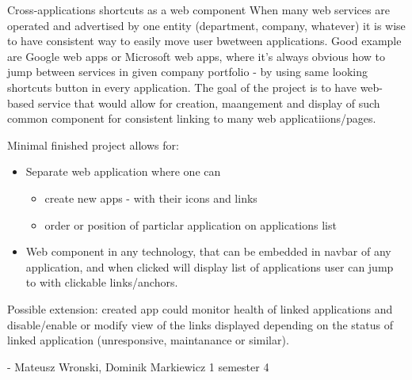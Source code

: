 \begin{project}
{Cross-applications shortcuts as a web component}
{When many web services are operated and advertised by one entity (department, company, whatever) it is wise to have consistent way to easily move user bwetween applications. Good example are Google web apps or Microsoft web apps, where it's always obvious how to jump between services in given company portfolio - by using same looking shortcuts button in every application. The goal of the project is to have web-based service that would allow for creation, maangement and display of such common component for consistent linking to many web applicatiions/pages.} 
{
Minimal finished project allows for:
\begin{itemize}
	\item Separate web application where one can 
		\begin{itemize}
			\item create new apps - with their icons and links
			\item order or position of particlar application on applications list
		\end{itemize}
	\item Web component in any technology, that can be embedded in navbar of any application, and when clicked will display list of applications user can jump to with clickable links/anchors.
\end{itemize}
Possible extension: created app could monitor health of linked applications and disable/enable or modify view of the links displayed depending on the status of linked application (unresponsive, maintanance or similar).
}
{-}
{Mateusz Wronski, Dominik Markiewicz}
{1 semester}
{4}
\end{project}
